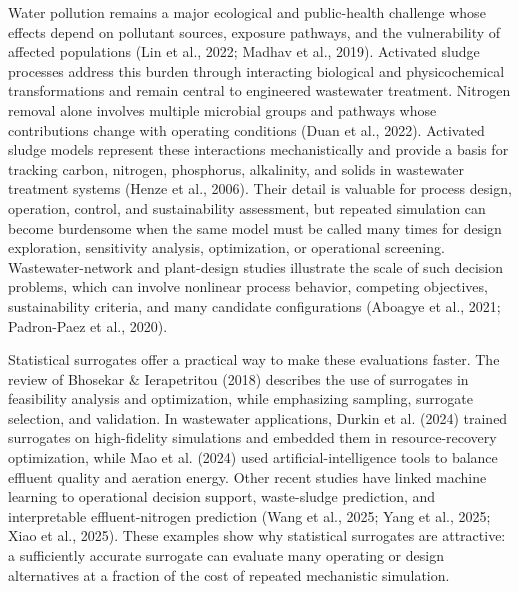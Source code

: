\documentclass[a4paper,fleqn]{cas-sc}
\begin{document}
Water pollution remains a major ecological and public-health challenge whose effects depend on pollutant sources, exposure pathways, and the vulnerability of affected populations (Lin et al., 2022; Madhav et al., 2019). Activated sludge processes address this burden through interacting biological and physicochemical transformations and remain central to engineered wastewater treatment. Nitrogen removal alone involves multiple microbial groups and pathways whose contributions change with operating conditions (Duan et al., 2022). Activated sludge models represent these interactions mechanistically and provide a basis for tracking carbon, nitrogen, phosphorus, alkalinity, and solids in wastewater treatment systems (Henze et al., 2006). Their detail is valuable for process design, operation, control, and sustainability assessment, but repeated simulation can become burdensome when the same model must be called many times for design exploration, sensitivity analysis, optimization, or operational screening. Wastewater-network and plant-design studies illustrate the scale of such decision problems, which can involve nonlinear process behavior, competing objectives, sustainability criteria, and many candidate configurations (Aboagye et al., 2021; Padron-Paez et al., 2020).

Statistical surrogates offer a practical way to make these evaluations faster. The review of Bhosekar \& Ierapetritou (2018) describes the use of surrogates in feasibility analysis and optimization, while emphasizing sampling, surrogate selection, and validation. In wastewater applications, Durkin et al. (2024) trained surrogates on high-fidelity simulations and embedded them in resource-recovery optimization, while Mao et al. (2024) used artificial-intelligence tools to balance effluent quality and aeration energy. Other recent studies have linked machine learning to operational decision support, waste-sludge prediction, and interpretable effluent-nitrogen prediction (Wang et al., 2025; Yang et al., 2025; Xiao et al., 2025). These examples show why statistical surrogates are attractive: a sufficiently accurate surrogate can evaluate many operating or design alternatives at a fraction of the cost of repeated mechanistic simulation.
\end{document}
